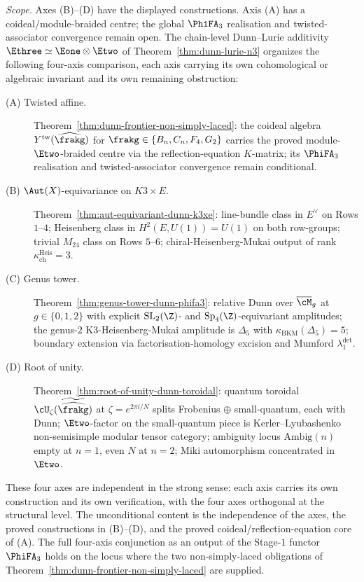 \begin{theorem}
\label{thm:bundled-dunn-frontier}
\noindent\emph{Scope.} Axes (B)--(D) have the displayed constructions.
Axis (A) has a coideal/module-braided centre; the global $\PhiFA_3$
realisation and twisted-associator convergence remain open.
The chain-level Dunn--Lurie additivity $\Ethree \simeq \Eone \otimes \Etwo$ of Theorem~\ref{thm:dunn-lurie-n3} organizes the following four-axis comparison, each axis carrying its own cohomological or algebraic invariant and its own remaining obstruction:
\begin{description}
\item[(A) Twisted affine.] Theorem~\ref{thm:dunn-frontier-non-simply-laced}: the coideal algebra $Y^{\mathrm{tw}}(\widehat\frakg)$ for $\frakg \in \{B_n, C_n, F_4, G_2\}$ carries the proved module-$\Etwo$-braided centre via the reflection-equation $K$-matrix; its $\PhiFA_3$ realisation and twisted-associator convergence remain conditional.
\item[(B) $\Aut(X)$-equivariance on $K3 \times E$.] Theorem~\ref{thm:aut-equivariant-dunn-k3xe}: line-bundle class in $E^\vee$ on Rows $1$--$4$; Heisenberg class in $H^2(E, U(1)) = U(1)$ on both row-groups; trivial $M_{24}$ class on Rows $5$--$6$; chiral-Heisenberg-Mukai output of rank $\kappa_{\mathrm{ch}}^{\mathrm{Heis}} = 3$.
\item[(C) Genus tower.] Theorem~\ref{thm:genus-tower-dunn-phifa3}: relative Dunn over $\overline{\cM}_g$ at $g \in \{0, 1, 2\}$ with explicit $\mathrm{SL}_2(\Z)$- and $\mathrm{Sp}_4(\Z)$-equivariant amplitudes; the genus-$2$ K3-Heisenberg-Mukai amplitude is $\Delta_5$ with $\kappa_{\mathrm{BKM}}(\Delta_5) = 5$; boundary extension via factorisation-homology excision and Mumford $\lambda_1^{\det}$.
\item[(D) Root of unity.] Theorem~\ref{thm:root-of-unity-dunn-toroidal}: quantum toroidal $\cU_\zeta(\widetilde{\widehat\frakg})$ at $\zeta = e^{2\pi i/N}$ splits Frobenius $\oplus$ small-quantum, each with Dunn; $\Etwo$-factor on the small-quantum piece is Kerler--Lyubashenko non-semisimple modular tensor category; ambiguity locus $\mathrm{Ambig}(n)$ empty at $n = 1$, even $N$ at $n = 2$; Miki automorphism concentrated in $\Etwo$.
\end{description}
These four axes are independent in the strong sense: each axis carries
its own construction and its own verification, with the four axes
orthogonal at the structural level. The unconditional content is the
independence of the axes, the proved constructions in (B)--(D), and
the proved coideal/reflection-equation core of (A). The full
four-axis conjunction as an output of the Stage-$1$ functor
$\PhiFA_3$ holds on the locus where the two non-simply-laced
obligations of Theorem~\ref{thm:dunn-frontier-non-simply-laced} are
supplied.
\end{theorem}

